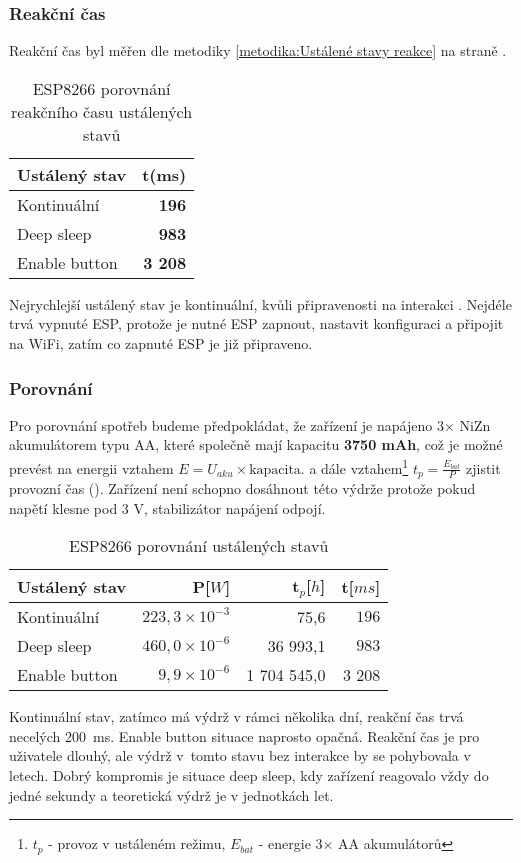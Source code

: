 \documentclass[a4paper, 12pt]{report}
\begin{document}
				\subsubsection{Reakční čas}
			 		Reakční čas byl měřen dle metodiky \ref{metodika:Ustálené stavy reakce} na straně \pageref{metodika:Ustálené stavy reakce}.
				 	\begin{table}[]
					 \centering
					 \caption{ESP8266 porovnání reakčního času ustálených stavů}
					 \begin{tabular}{||l|r||}
						 \hline
						 Ustálený stav & t(ms)\\
						 \hline
						 Kontinuální & {\bf 196}\\
						 Deep sleep & {\bf 983}\\
						 Enable button & {\bf 3 208}\\
						 \hline
					 \end{tabular}
					 \label{ESP8266 klidové režimy čas}
				 	\end{table}
					Nejrychlejší ustálený stav je kontinuální, kvůli připravenosti na interakci . Nejdéle trvá vypnuté ESP, protože je nutné ESP zapnout, nastavit konfiguraci a připojit na WiFi, zatím co zapnuté ESP je již připraveno.
				\subsubsection{Porovnání}
					Pro porovnání spotřeb budeme předpokládat, že zařízení je napájeno 3$\times$ NiZn akumulátorem typu AA, které společně mají kapacitu {\bf 3750 mAh}, což je možné prevést na energii vztahem $E = U_{aku}\times \textrm{kapacita}$.
					a dále vztahem\footnote{$ t_{p}$ - provoz v ustáleném režimu, $ E_{bat}$ - energie 3$\times$ AA akumulátorů} $ t_{p} = \frac{E_{bat}}{P}$ zjistit provozní čas (). Zařízení není schopno dosáhnout této výdrže protože pokud napětí klesne pod 3 V, stabilizátor napájení odpojí.

					\begin{table}[h!]
						\centering
						\caption{ESP8266 porovnání ustálených stavů}
						\begin{tabular}{||l|r r r||}
							\hline
							Ustálený stav & P[$W$]& t$_{p}$[$h$] & t[$ms$]\\
							\hline
							Kontinuální & $223,3 \times 10^{-3}$& 75,6 & $196$\\
							Deep sleep & $460,0 \times 10^{-6}$& 36 993,1 & $983$\\
							Enable button & $9,9\times 10^{-6}$& 1 704 545,0 &  3 208\\
							\hline
						\end{tabular}
						\label{ESP8266 klidové režimy porovnani}
					\end{table}
					Kontinuální stav, zatímco má výdrž v rámci několika dní, reakční čas trvá necelých 200~ms. Enable button situace naprosto opačná. Reakční čas je pro uživatele dlouhý, ale výdrž v~tomto stavu bez interakce by se pohybovala v letech. Dobrý kompromis je situace deep sleep, kdy zařízení reagovalo vždy do jedné sekundy a teoretická výdrž je v jednotkách let.\\
\end{document}
